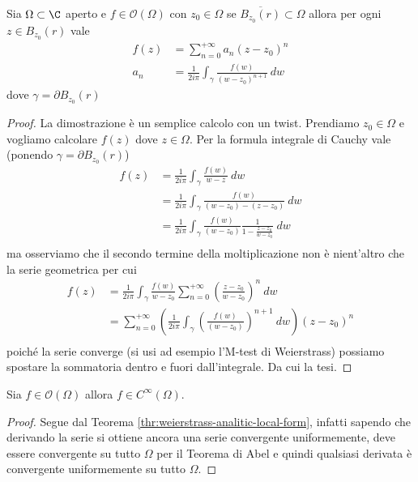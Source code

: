 \begin{theorem}
    Sia $\Omega \subset \C$ aperto e $f \in \mathcal{O}(\Omega)$ con $z_0 \in
    \Omega$ se $\overline{B_{z_0}(r)} \subset \Omega$ allora per ogni $z \in
    B_{z_0}(r)$ vale
    \begin{equation*}
      \begin{aligned}
         f(z) & = \sum^{+\infty}_{n=0} a_n(z-z_0)^n \\ 
         a_n  & =\frac{1}{2i\pi} \int_\gamma \frac{f(w)}{(w-z_0)^{n+1}}\ dw
      \end{aligned}
    \end{equation*}
    dove $\gamma = \partial B_{z_0}(r)$
    \label{thr:weierstrass-analitic-local-form}
\end{theorem}
\begin{proof}
    La dimostrazione è un semplice calcolo con un twist. 
    Prendiamo $z_0 \in \Omega$ e vogliamo calcolare $f(z)$ dove $z\in
    \Omega$. Per la formula integrale di Cauchy vale (ponendo $\gamma
    = \partial B_{z_0}(r)$) 
    \begin{align*}
      f(z) & = \frac{1}{2i\pi} \int_\gamma \frac{f(w)}{w-z}\ dw \\
           & = \frac{1}{2i\pi} \int_\gamma \frac{f(w)}{(w-z_0) - (z-z_0)}\
           dw \\
           & = \frac{1}{2i\pi} \int_\gamma \frac{f(w)}{(w-z_0)}
           \frac{1}{1 - \frac{z - z_0}{w-z_0}} \ dw \\
    \end{align*}
    ma osserviamo che il secondo termine della moltiplicazione non
    è nient'altro che la serie geometrica per cui 
    \begin{align*}
      f(z) 	& = \frac{1}{2i\pi} \int_\gamma \frac{f(w)}{w-z_0}\sum^{+\infty}_{n=0} \left(\frac{z-z_0}{w-z_0}\right)^n \ dw \\
     	 	 	&  = \sum^{+\infty}_{n=0} \left(\frac{1}{2i\pi} \int_\gamma \left(\frac{f(w)}{(w-z_0)}\right)^{n+1} \ dw\right) (z-z_0)^n  \\
    \end{align*}
    poiché la serie converge (si usi ad esempio l'M-test di Weierstrass)
    possiamo spostare la sommatoria dentro e fuori dall'integrale. Da cui
    la tesi.
\end{proof}

\begin{corollary}
  Sia $f \in \mathcal{O}(\Omega)$ allora $f \in C^{\infty}(\Omega)$.
  \label{cor:olomorphism-c-infty}
\end{corollary}
\begin{proof}
  Segue dal Teorema \ref{thr:weierstrass-analitic-local-form}, infatti
  sapendo che derivando la serie si ottiene ancora una serie convergente
  uniformemente, deve essere convergente su tutto $\Omega$ per il Teorema di
  Abel e quindi qualsiasi derivata è convergente uniformemente su tutto
  $\Omega$. 
\end{proof}

